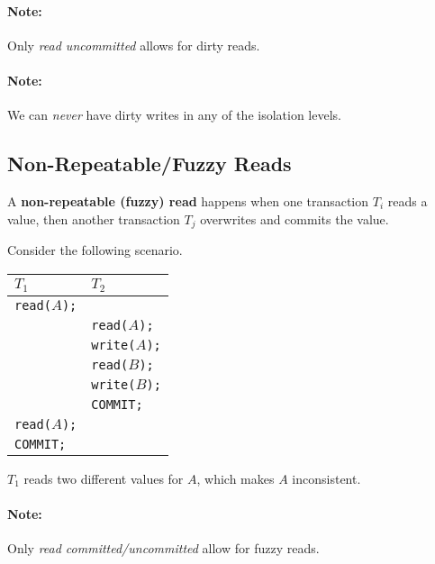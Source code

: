 \documentclass{report}
\newenvironment{definition}[1]{\begin{tcolorbox}[title={Definition: #1}]}{\end{tcolorbox}}
\newenvironment{example}{\begin{tcolorbox}[title={Example},colback=green!5!white,colframe=black!75!green]}{\end{tcolorbox}}
\renewcommand{\bf}[1]{\textbf{{#1}}}
\renewcommand{\tt}[1]{\texttt{{#1}}}
\renewcommand{\it}[1]{\textit{{#1}}}
\begin{document}
\paragraph{Note:} Only \it{read uncommitted} allows for dirty reads.

\paragraph{Note:} We can \it{never} have dirty writes in any of the isolation
levels.

\subsection{Non-Repeatable/Fuzzy Reads}
\begin{definition}{Dirty Read and Write}
    A \bf{non-repeatable (fuzzy) read} happens when one transaction $T_i$ reads
    a value, then another transaction $T_j$ overwrites and commits the value.
\end{definition}

\begin{example}
    Consider the following scenario.

    {
        \centering
        \begin{tabular}{l|l}
            $T_1$ & $T_2$ \\
            \hline
            \tt{read($A$);} & \\
                             & \tt{read($A$);} \\
                             & \tt{write($A$);} \\
                             & \tt{read($B$);} \\
                             & \tt{write($B$);} \\
                             & \tt{COMMIT;} \\
            \tt{read($A$);} & \\
            \tt{COMMIT;} & \\
        \end{tabular}
        \par
    }

    $T_1$ reads two different values for $A$, which makes $A$ inconsistent.
\end{example}
\paragraph{Note:} Only \it{read committed/uncommitted} allow for fuzzy reads.
\end{document}
